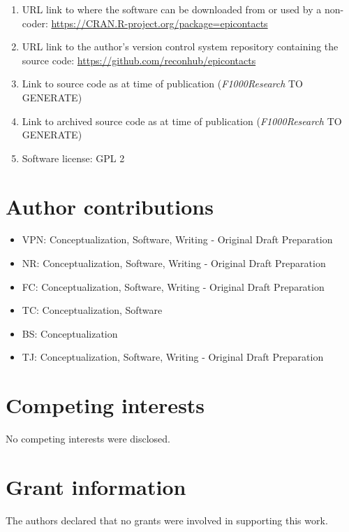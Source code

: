 \documentclass[9pt,a4paper,]{extarticle}
\theoremstyle{definition}
\theoremstyle{definition}
\theoremstyle{definition}
\theoremstyle{remark}
\begin{document}
\begin{enumerate}
\def\labelenumi{\arabic{enumi}.}
\item
  URL link to where the software can be downloaded from or used by a non-coder: \url{https://CRAN.R-project.org/package=epicontacts}
\item
  URL link to the author's version control system repository containing the source code: \url{https://github.com/reconhub/epicontacts}
\item
  Link to source code as at time of publication (\emph{F1000Research} TO GENERATE)
\item
  Link to archived source code as at time of publication (\emph{F1000Research} TO GENERATE)
\item
  Software license: GPL 2
\end{enumerate}

\section{Author contributions}\label{author-contributions}

\begin{itemize}
\item
  VPN: Conceptualization, Software, Writing - Original Draft Preparation
\item
  NR: Conceptualization, Software, Writing - Original Draft Preparation
\item
  FC: Conceptualization, Software, Writing - Original Draft Preparation
\item
  TC: Conceptualization, Software
\item
  BS: Conceptualization
\item
  TJ: Conceptualization, Software, Writing - Original Draft Preparation
\end{itemize}

\section{Competing interests}\label{competing-interests}

No competing interests were disclosed.

\section{Grant information}\label{grant-information}

The authors declared that no grants were involved in supporting this work.

{\small}
\end{document}
